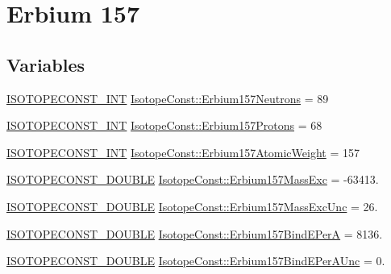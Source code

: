 \hypertarget{group___isotope_const-_erbium-_er157}{}\section{Erbium 157}
\label{group___isotope_const-_erbium-_er157}
\subsection*{Variables}
\begin{DoxyCompactItemize}
\item 
\mbox{\hyperlink{group___isotope_const-_macros_ga5f18360b3e99483a35c32d789e62621c}{I\+S\+O\+T\+O\+P\+E\+C\+O\+N\+S\+T\+\_\+\+I\+NT}} \mbox{\hyperlink{group___isotope_const-_erbium-_er157_ga6b92821c93d24eae401ed84a144f1b7d}{Isotope\+Const\+::\+Erbium157\+Neutrons}} = 89
\item 
\mbox{\hyperlink{group___isotope_const-_macros_ga5f18360b3e99483a35c32d789e62621c}{I\+S\+O\+T\+O\+P\+E\+C\+O\+N\+S\+T\+\_\+\+I\+NT}} \mbox{\hyperlink{group___isotope_const-_erbium-_er157_ga5e12f8ff1ea23f604121958d72398123}{Isotope\+Const\+::\+Erbium157\+Protons}} = 68
\item 
\mbox{\hyperlink{group___isotope_const-_macros_ga5f18360b3e99483a35c32d789e62621c}{I\+S\+O\+T\+O\+P\+E\+C\+O\+N\+S\+T\+\_\+\+I\+NT}} \mbox{\hyperlink{group___isotope_const-_erbium-_er157_ga202f72fd10c318b456c1ce90b785f4d1}{Isotope\+Const\+::\+Erbium157\+Atomic\+Weight}} = 157
\item 
\mbox{\hyperlink{group___isotope_const-_macros_ga8f45a7272ce02c0b4c65c44636ed719a}{I\+S\+O\+T\+O\+P\+E\+C\+O\+N\+S\+T\+\_\+\+D\+O\+U\+B\+LE}} \mbox{\hyperlink{group___isotope_const-_erbium-_er157_ga2094b9088d3888a667b43842868e647b}{Isotope\+Const\+::\+Erbium157\+Mass\+Exc}} = -\/63413.
\item 
\mbox{\hyperlink{group___isotope_const-_macros_ga8f45a7272ce02c0b4c65c44636ed719a}{I\+S\+O\+T\+O\+P\+E\+C\+O\+N\+S\+T\+\_\+\+D\+O\+U\+B\+LE}} \mbox{\hyperlink{group___isotope_const-_erbium-_er157_gab2c4e3c2c10bbb32e97f5a4b13d63d2c}{Isotope\+Const\+::\+Erbium157\+Mass\+Exc\+Unc}} = 26.
\item 
\mbox{\hyperlink{group___isotope_const-_macros_ga8f45a7272ce02c0b4c65c44636ed719a}{I\+S\+O\+T\+O\+P\+E\+C\+O\+N\+S\+T\+\_\+\+D\+O\+U\+B\+LE}} \mbox{\hyperlink{group___isotope_const-_erbium-_er157_gac3657f8ee53b72e425e40c2297268a18}{Isotope\+Const\+::\+Erbium157\+Bind\+E\+PerA}} = 8136.
\item 
\mbox{\hyperlink{group___isotope_const-_macros_ga8f45a7272ce02c0b4c65c44636ed719a}{I\+S\+O\+T\+O\+P\+E\+C\+O\+N\+S\+T\+\_\+\+D\+O\+U\+B\+LE}} \mbox{\hyperlink{group___isotope_const-_erbium-_er157_gaecddb25202f2a8a3b80fdaf1d3279ad8}{Isotope\+Const\+::\+Erbium157\+Bind\+E\+Per\+A\+Unc}} = 0.

\end{DoxyCompactItemize}
